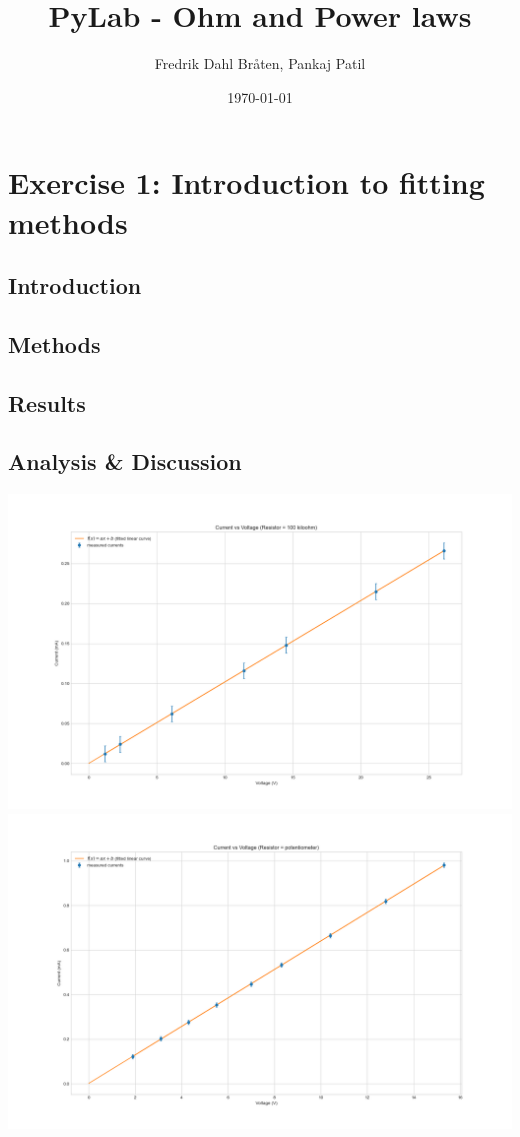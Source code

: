 \documentclass[letterpaper,12pt]{article}
\begin{document}
\title{PyLab - Ohm and Power laws}
\author{Fredrik Dahl Bråten, Pankaj Patil}
\date{\today}
\maketitle

\section{Exercise 1:  Introduction to fitting methods}

\subsection{Introduction}

\linebreak
{}
\subsection{Methods}
\subsection{Results}
\subsection{Analysis \& Discussion }

\begin{center}
    \includegraphics[width=1.0\linewidth]{../lab_1_ex_1_plot_100k.png}    
    \includegraphics[width=1.0\linewidth]{../lab_1_ex_1_plot_potentiometer.png}    
\end{center}
\end{document}
